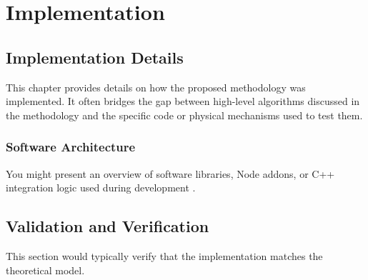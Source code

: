 \chapter{Implementation}
\label{chap:implementation}

\section{Implementation Details}
This chapter provides details on how the proposed methodology was implemented. It often bridges the gap between high-level algorithms discussed in the methodology and the specific code or physical mechanisms used to test them.

\subsection{Software Architecture}
You might present an overview of software libraries, Node addons, or C++ integration logic used during development \cite{napi}.

\section{Validation and Verification}
This section would typically verify that the implementation matches the theoretical model.

